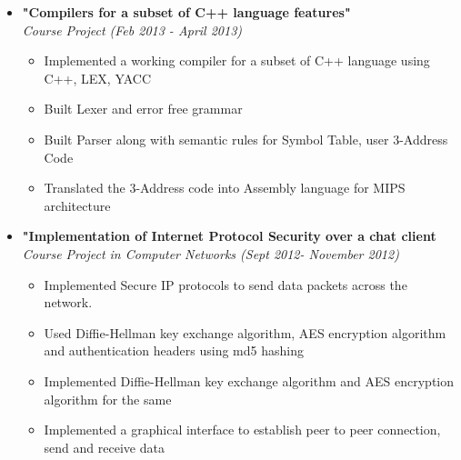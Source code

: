 \documentclass[margin,line]{resume}
\begin{document}
\begin{resume}
\begin{itemize}
  \item \large{\textbf{\textsf{"Compilers for a subset of C++ language features"}}}
    \\ \small{\textit{Course Project (Feb 2013 - April 2013)}}
    \normalsize
    \begin{itemize}
    \item Implemented a working compiler for a subset of C++ language using C++, LEX, YACC
    \item Built Lexer and error free grammar
    \item Built Parser along with semantic rules for Symbol Table, user 3-Address Code
    \item Translated the 3-Address code into Assembly language for MIPS architecture
    \end{itemize}

  \item \large{\textbf{\textsf{"Implementation of Internet Protocol Security over a chat client}}}
    \\ \small{\textit{Course Project in Computer Networks (Sept 2012- November 2012)}}
    \normalsize
    \begin{itemize}
    \item Implemented Secure IP protocols to send data packets across the network.
    \item Used Diffie-Hellman key exchange algorithm, AES encryption algorithm and authentication headers using md5 hashing
    \item Implemented Diffie-Hellman key exchange algorithm and AES encryption algorithm for the same
    \item Implemented a graphical interface to establish peer to peer connection, send and receive data
    \end{itemize}


\end{itemize}
\end{resume}
\end{document}
